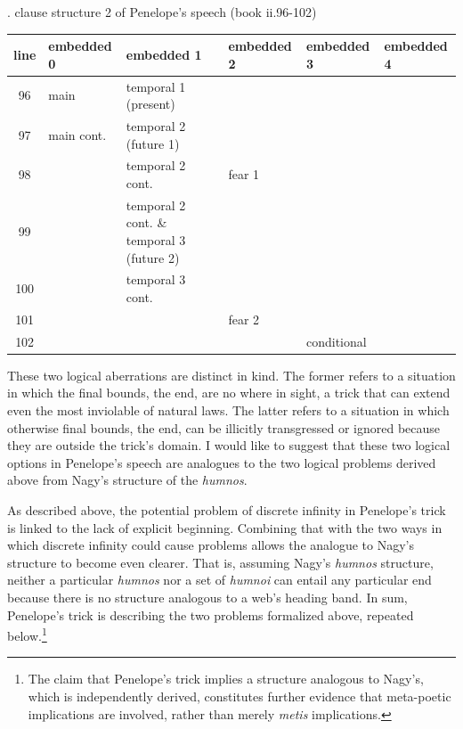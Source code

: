 \documentclass[12pt]{article}
\begin{document}
\begin{singlespacing}
\ex. clause structure 2 of Penelope's speech (book ii.96-102)

\begin{footnotesize}

\begin{tabularx}{\textwidth}{
|c
|>{\centering\arraybackslash}X
|>{\centering\arraybackslash}X
|>{\centering\arraybackslash}X
|>{\centering\arraybackslash}X
|>{\centering\arraybackslash}X
|
}
\hline
line & embedded 0 & embedded 1 & embedded 2 & embedded 3 & embedded 4 \\
\hline \hline
96 & main & temporal 1 (present) & & & \\
\hline
97 & main cont. & temporal 2 (future 1) & & & \\
\hline
98 & & temporal 2 cont. & fear 1 & & \\
\hline
99 & & temporal 2 cont. \& temporal 3 (future 2) & & & \\
\hline
100 & & temporal 3 cont. & & & \\
\hline
101 & & &  fear 2 & & \\
\hline
102 & & & & conditional & \\
\hline

\end{tabularx}
\end{footnotesize}
\end{singlespacing}

These two logical aberrations are distinct in kind. The former refers to a situation in which the final bounds, the end, are no where in sight, a trick that can extend even the most inviolable of natural laws. The latter refers to a situation in which otherwise final bounds, the end, can be illicitly transgressed or ignored because they are outside the trick's domain. I would like to suggest that these two logical options in Penelope's speech are analogues to the two logical problems derived above from Nagy's structure of the \textit{humnos}.

As described above, the potential problem of discrete infinity in Penelope's trick is linked to the lack of explicit beginning. Combining that with the two ways in which discrete infinity could cause problems allows the analogue to Nagy's structure to become even clearer. That is, assuming Nagy's \textit{humnos} structure, neither a particular \textit{humnos} nor a set of \textit{humnoi} can entail any particular end because there is no structure analogous to a web's heading band. In sum, Penelope's trick is describing the two problems formalized above, repeated below.\footnote{ The claim that Penelope's trick implies a structure analogous to Nagy's, which is independently derived, constitutes further evidence that meta-poetic implications are involved, rather than merely \textit{metis} implications.}
\end{document}
